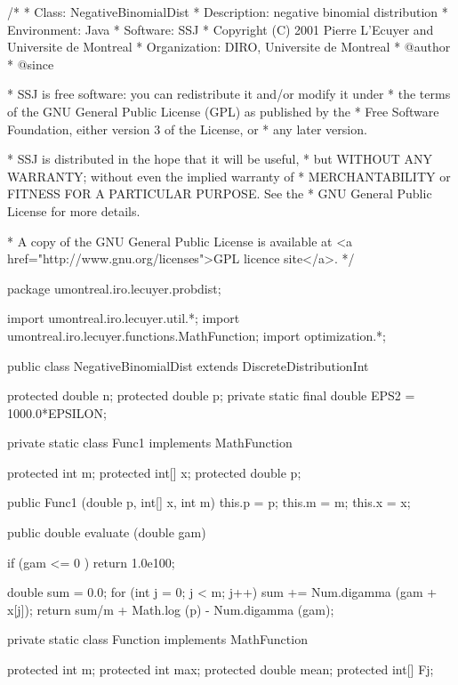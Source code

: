 \begin{code}
\begin{hide}
/*
 * Class:        NegativeBinomialDist
 * Description:  negative binomial distribution
 * Environment:  Java
 * Software:     SSJ
 * Copyright (C) 2001  Pierre L'Ecuyer and Universite de Montreal
 * Organization: DIRO, Universite de Montreal
 * @author
 * @since

 * SSJ is free software: you can redistribute it and/or modify it under
 * the terms of the GNU General Public License (GPL) as published by the
 * Free Software Foundation, either version 3 of the License, or
 * any later version.

 * SSJ is distributed in the hope that it will be useful,
 * but WITHOUT ANY WARRANTY; without even the implied warranty of
 * MERCHANTABILITY or FITNESS FOR A PARTICULAR PURPOSE.  See the
 * GNU General Public License for more details.

 * A copy of the GNU General Public License is available at
   <a href="http://www.gnu.org/licenses">GPL licence site</a>.
 */
\end{hide}
package umontreal.iro.lecuyer.probdist;
\begin{hide}
import umontreal.iro.lecuyer.util.*;
import umontreal.iro.lecuyer.functions.MathFunction;
import optimization.*;
\end{hide}

public class NegativeBinomialDist extends DiscreteDistributionInt\begin{hide} {
   protected double n;
   protected double p;
   private static final double EPS2 = 1000.0*EPSILON;

   private static class Func1 implements MathFunction {
      protected int m;
      protected int[] x;
      protected double p;

      public Func1 (double p, int[] x, int m) {
         this.p = p;
         this.m = m;
         this.x = x;
      }

      public double evaluate (double gam) {
         if (gam <= 0 ) return 1.0e100;

         double sum = 0.0;
         for (int j = 0; j < m; j++)
            sum += Num.digamma (gam + x[j]);
         return sum/m + Math.log (p) - Num.digamma (gam);
      }
   }


   private static class Function implements MathFunction {
      protected int m;
      protected int max;
      protected double mean;
      protected int[] Fj;

}}
\end{hide}
\end{code}

